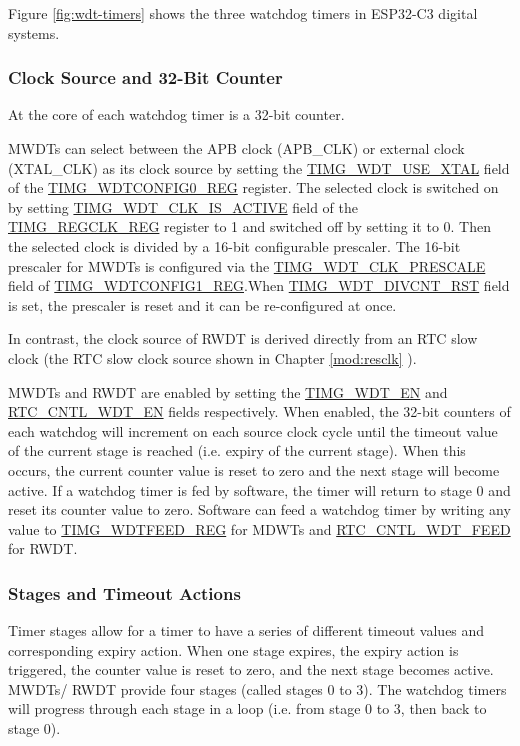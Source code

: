\documentclass[main\_\_EN.tex]{subfiles}
\begin{document}
Figure \ref{fig:wdt-timers} shows the three watchdog timers in ESP32-C3 digital systems.

\subsubsection{Clock Source and 32-Bit Counter}
At the core of each watchdog timer is a 32-bit counter. 

MWDTs can select between the APB clock (APB\_CLK) or external clock (XTAL\_CLK) as its clock source by setting the \hyperref[fielddesc:TIMGWDTUSEXTAL]{TIMG\_WDT\_USE\_XTAL} field of the \hyperref[regdesc:TIMGWDTCONFIG0REG]{TIMG\_WDTCONFIG0\_REG} register. The selected clock is switched on by setting \hyperref[fielddesc:TIMGWDTCLKISACTIVE]{TIMG\_WDT\_CLK\_IS\_ACTIVE} field of the \hyperref[regdesc:TIMGREGCLKREG]{TIMG\_REGCLK\_REG} register to 1 and switched off by setting it to 0. Then the selected clock is 
divided by a 16-bit configurable prescaler. The 16-bit prescaler for MWDTs is configured via the \hyperref[fielddesc:TIMGWDTCLKPRESCALE]{TIMG\_WDT\_CLK\_PRESCALE} field of \hyperref[regdesc:TIMGWDTCONFIG1REG]{TIMG\_WDTCONFIG1\_REG}.When \hyperref[fielddesc:TIMGWDTDIVCNTRST]{TIMG\_WDT\_DIVCNT\_RST} field is set, the 
prescaler is reset and it can be re-configured at once.

In contrast, the clock source of RWDT is derived directly from an RTC slow clock (the RTC slow clock source shown in Chapter \ref{mod:resclk} \textit{}). 


MWDTs and RWDT are enabled by setting the \hyperref[fielddesc:TIMGWDTEN]{TIMG\_WDT\_EN} and \hyperref[fielddesc:RTCCNTLWDTEN]{RTC\_CNTL\_WDT\_EN} fields respectively. When enabled, the 32-bit counters of each watchdog will increment on each source clock cycle until the timeout value of the current stage is reached (i.e. expiry of the current stage). When this occurs, the current counter value is reset to zero and the next stage will become active.  If a watchdog timer is fed by software, the timer will return to stage 0 and reset its counter value to zero. Software can feed a watchdog timer by writing any value to \hyperref[regdesc:TIMGWDTFEEDREG]{TIMG\_WDTFEED\_REG} for MDWTs and \hyperref[fielddesc:RTCCNTLWDTFEED]{RTC\_CNTL\_WDT\_FEED} for RWDT.


\subsubsection{Stages and Timeout Actions}\label{sec:wdt-timeout}
Timer stages allow for a timer to have a series of different timeout values and corresponding expiry action. When one stage expires, the expiry action is triggered, the counter value is reset to zero, and the next stage becomes active. MWDTs/ RWDT provide four stages (called stages 0 to 3). The watchdog timers will progress through each stage in a loop (i.e. from stage 0 to 3, then back to stage 0).
\end{document}

